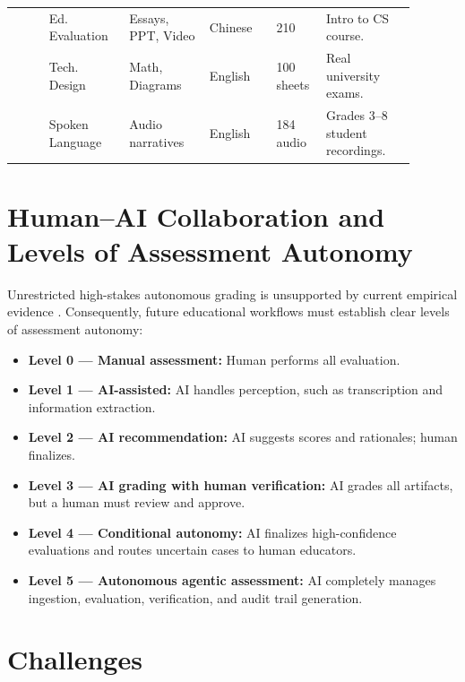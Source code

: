 \documentclass[11pt,a4paper]{article}
\begin{document}
\begin{longtable}{p{0.08\linewidth} p{0.18\linewidth} p{0.18\linewidth} p{0.15\linewidth} p{0.1\linewidth} p{0.2\linewidth}}
\addlinespace

\cite{P020} &
Ed. Evaluation &
Essays, PPT, Video &
Chinese &
210 &
Intro to CS course. \\

\addlinespace

\cite{P022} &
Tech. Design &
Math, Diagrams &
English &
100 sheets &
Real university exams. \\

\addlinespace

\cite{P029} &
Spoken Language &
Audio narratives &
English &
184 audio &
Grades 3--8 student recordings. \\

\end{longtable}

\section{Human--AI Collaboration and Levels of Assessment Autonomy}

Unrestricted high-stakes autonomous grading is unsupported by current empirical evidence \cite{P014, P019}. Consequently, future educational workflows must establish clear levels of assessment autonomy:
\begin{itemize}
    \item \textbf{Level 0 --- Manual assessment:} Human performs all evaluation.
    \item \textbf{Level 1 --- AI-assisted:} AI handles perception, such as transcription and information extraction.
    \item \textbf{Level 2 --- AI recommendation:} AI suggests scores and rationales; human finalizes.
    \item \textbf{Level 3 --- AI grading with human verification:} AI grades all artifacts, but a human must review and approve.
    \item \textbf{Level 4 --- Conditional autonomy:} AI finalizes high-confidence evaluations and routes uncertain cases to human educators.
    \item \textbf{Level 5 --- Autonomous agentic assessment:} AI completely manages ingestion, evaluation, verification, and audit trail generation.
\end{itemize}

\section{Challenges}
\end{document}
